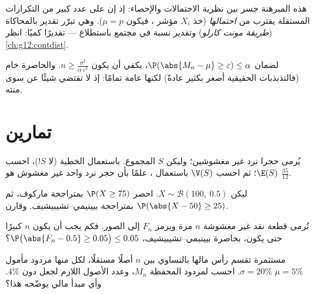 \begin{remark}
هذه المبرهنة جسر بين نظرية الاحتمالات والإحصاء: إذ إن \emph{}
 على عدد كبير من التكرارات المستقلة يقترب من
\emph{احتمالها} (خذ $X_i$ مؤشر ، فيكون
$\mu = p$). وهي تبرّر تقدير  بالمحاكاة
(\emph{طريقة مونت كارلو}) وتقدير نسبة في مجتمع باستطلاع ---
تقديرًا كميًا: انظر \cref{ch:g12:contdist}.
\end{remark}

\begin{method}\label{met:g12:sums:chebyshev}
لضمان $\P(\abs{M_n - \mu} \geq \varepsilon) \leq \alpha$، يكفي
أن يكون $n \geq \frac{\sigma^2}{\alpha\,\varepsilon^2}$. والحاصرة
خام (فالتذبذبات الحقيقية أصغر بكثير عادةً) لكنها عامة تمامًا:
إذ لا تقتضي شيئًا عن  سوى  منته.
\end{method}

\section{تمارين}

\begin{exercise}[$\star$]\label{exo:g12:sums:1}
يُرمى حجرا نرد غير مغشوشين؛ وليكن $S$ المجموع. باستعمال الخطية (لا
 $S$!)، احسب $\E(S)$؛ ثم احسب $\V(S)$ باستعمال
، علمًا بأن  حجر نرد واحد غير مغشوش هو $\frac{35}{12}$.
\end{exercise}

\begin{exercise}[$\star$]\label{exo:g12:sums:2}
ليكن $X \sim \mathcal B(100,\ 0.5)$. احصر
$\P(X \geq 75)$ بمتراجحة ماركوف، ثم
$\P(\abs{X - 50} \geq 25)$ بمتراجحة بيينيمي--تشيبيشيف. وقارن.
\end{exercise}

\begin{exercise}[$\star$]\label{exo:g12:sums:3}
تُرمى قطعة نقد غير مغشوشة $n$ مرة ويرمز $F_n$ إلى  الصور.
فكم يجب أن يكون $n$ كبيرًا حتى يكون، بحاصرة بيينيمي--تشيبيشيف،
$\P\bigl(\abs{F_n - 0.5} \geq 0.05\bigr) \leq 0.05$؟
\end{exercise}

\begin{exercise}[$\star\star$]\label{exo:g12:sums:4}
مستثمرة تقسم رأس مالها بالتساوي بين $n$ أصلًا مستقلًا،
لكل منها مردود مأمول $\mu = 5\%$ 
$\sigma = 20\%$. احسب   لمردود
المحفظة $M_n$، وعدد الأصول اللازم لجعل
 دون $4\%$. وأي مبدأ مالي يوضّحه
هذا؟
\end{exercise}

